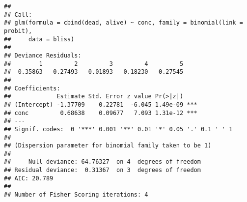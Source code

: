 \documentclass[
]{article}
\newenvironment{Shaded}{\begin{snugshade}}{\end{snugshade}}
\newcommand{\AttributeTok}[1]{\textcolor[rgb]{0.13,0.29,0.53}{#1}}
\newcommand{\DecValTok}[1]{\textcolor[rgb]{0.00,0.00,0.81}{#1}}
\newcommand{\FunctionTok}[1]{\textcolor[rgb]{0.13,0.29,0.53}{\textbf{#1}}}
\newcommand{\NormalTok}[1]{#1}
\newcommand{\OtherTok}[1]{\textcolor[rgb]{0.56,0.35,0.01}{#1}}
\newcommand{\SpecialCharTok}[1]{\textcolor[rgb]{0.81,0.36,0.00}{\textbf{#1}}}
\newcommand{\StringTok}[1]{\textcolor[rgb]{0.31,0.60,0.02}{#1}}
\begin{document}
\begin{verbatim}
## 
## Call:
## glm(formula = cbind(dead, alive) ~ conc, family = binomial(link = probit), 
##     data = bliss)
## 
## Deviance Residuals: 
##        1         2         3         4         5  
## -0.35863   0.27493   0.01893   0.18230  -0.27545  
## 
## Coefficients:
##             Estimate Std. Error z value Pr(>|z|)    
## (Intercept) -1.37709    0.22781  -6.045 1.49e-09 ***
## conc         0.68638    0.09677   7.093 1.31e-12 ***
## ---
## Signif. codes:  0 '***' 0.001 '**' 0.01 '*' 0.05 '.' 0.1 ' ' 1
## 
## (Dispersion parameter for binomial family taken to be 1)
## 
##     Null deviance: 64.76327  on 4  degrees of freedom
## Residual deviance:  0.31367  on 3  degrees of freedom
## AIC: 20.789
## 
## Number of Fisher Scoring iterations: 4
\end{verbatim}

\begin{Shaded}
\end{Shaded}
\end{document}
